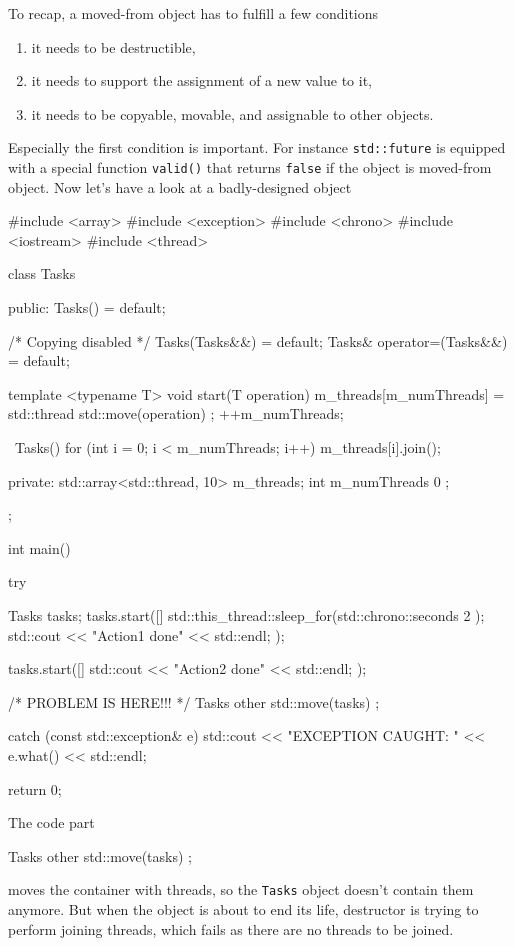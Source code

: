 \documentclass[../main]{subfiles}
\begin{document}
    To recap, a moved-from object has to fulfill a few conditions
\begin{enumerate}
    \item it needs to be destructible,
    \item it needs to support the assignment of a new value to it,
    \item it needs to be copyable, movable, and assignable to other objects.
\end{enumerate}
\noindent
    Especially the first condition is important. For instance \texttt{std::future} is equipped with a special function \texttt{valid()} that returns \texttt{false}
if the object is moved-from object. Now let's have a look at a badly-designed object
\begin{Code}
    #include <array>
    #include <exception>
    #include <chrono>
    #include <iostream>
    #include <thread>
    
    class Tasks
    {
    public:
        Tasks() = default;
    
        /* Copying disabled */
        Tasks(Tasks&&) = default;
        Tasks& operator=(Tasks&&) = default;
    
        template <typename T>
        void start(T operation)
        {
            m_threads[m_numThreads] = std::thread { std::move(operation) };
            ++m_numThreads;
        }
    
        ~Tasks()
        {
            for (int i = 0; i < m_numThreads; i++)
            {
                m_threads[i].join();
            }
        }
    
    private:
        std::array<std::thread, 10> m_threads;
        int m_numThreads { 0 };
    };
    
    int main()
    {
        try
        {
            Tasks tasks;
            tasks.start([]
            {
                std::this_thread::sleep_for(std::chrono::seconds { 2 });
                std::cout << "Action1 done" << std::endl;
            });
    
            tasks.start([]
            {
                std::cout << "Action2 done" << std::endl;
            });

            /* PROBLEM IS HERE!!! */
            Tasks other { std::move(tasks) };
        }
        catch (const std::exception& e)
        {
            std::cout << "EXCEPTION CAUGHT: " << e.what() << std::endl;
        }
    
        return 0;
    }
\end{Code}
\noindent
The code part
\begin{Code}
    Tasks other { std::move(tasks) };
\end{Code}
moves the container with threads, so the \texttt{Tasks} object doesn't contain them anymore. But when the object is about to end its life,
destructor is trying to perform joining threads, which fails as there are no threads to be joined.\newline
\end{document}
